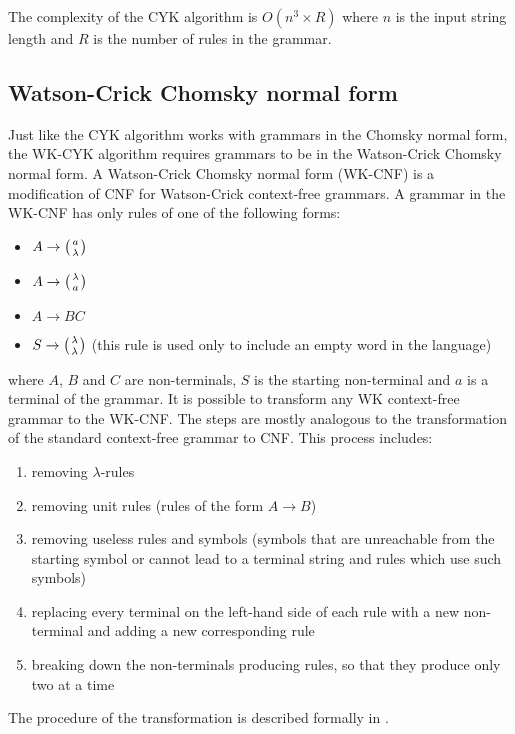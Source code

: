 The complexity of the CYK algorithm is $O(n^3 \times R)$ where $n$ is the input string length and $R$ is the number of rules in the grammar.

\subsection{Watson-Crick Chomsky normal form}
Just like the CYK algorithm works with grammars in the Chomsky normal form, the WK-CYK algorithm requires grammars to be in the Watson-Crick Chomsky normal form. A Watson-Crick Chomsky normal form (WK-CNF) is a modification of CNF for Watson-Crick context-free grammars. A grammar in the WK-CNF has only rules of one of the following forms:

\begin{itemize}
  \item{$A \rightarrow \wkpair{a}{\lambda}$}
  \item{$A \rightarrow \wkpair{\lambda}{a}$}
  \item{$A \rightarrow B C$}
  \item{$S \rightarrow \wkpair{\lambda}{\lambda}$ (this rule is used only to include an empty word in the language)}
\end{itemize}

where $A$, $B$ and $C$ are non-terminals, $S$ is the starting non-terminal and $a$ is a terminal of the grammar. It is possible to transform any WK context-free grammar to the WK-CNF. The steps are mostly analogous to the transformation of the standard context-free grammar to CNF. This process includes:

\begin{enumerate}
  \item{removing $\lambda$-rules}
  \item{removing unit rules (rules of the form $A \rightarrow B$)}
  \item{removing useless rules and symbols (symbols that are unreachable from the starting symbol or cannot lead to a terminal string and rules which use such symbols)}
  \item{replacing every terminal on the left-hand side of each rule with a new non-terminal and adding a new corresponding rule}
  \item{breaking down the non-terminals producing rules, so that they produce only two at a time}
\end{enumerate}

The procedure of the transformation is described formally in \cite{WK_CYK}.



